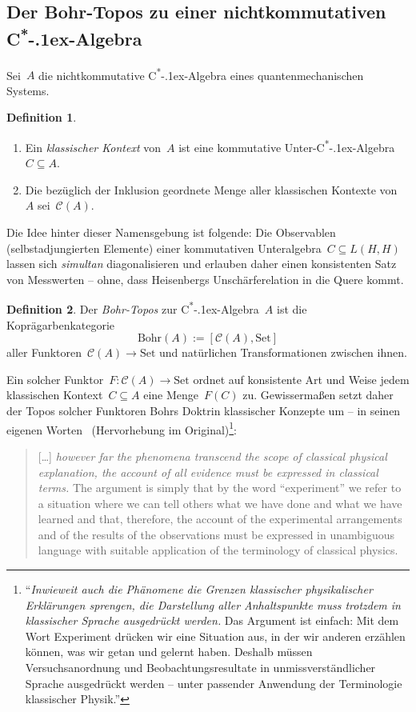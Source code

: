 \documentclass[a4paper,ngerman,12pt]{scrartcl}
\theoremstyle{definition}
\newtheorem{defn}{Definition}[section]
\theoremstyle{plain}
\theoremstyle{remark}
\newcommand{\C}{\mathcal{C}}
\newcommand{\Bohr}{\mathrm{Bohr}}
\newcommand{\csalgebra}{C\textsuperscript{*}\kern-.1ex-Algebra}
\newcommand{\Set}{\mathrm{Set}}
\renewcommand{\_}{\mathpunct{.}\,}
\newcommand{\?}{\,{:}\,}
\begin{document}
\subsection{Der Bohr-Topos zu einer nichtkommutativen \csalgebra}

Sei~$A$ die nichtkommutative \csalgebra{} eines quantenmechanischen Systems.

\begin{defn}\begin{enumerate}
\item
Ein \emph{klassischer Kontext} von~$A$ ist eine kommutative Unter-\csalgebra~$C
\subseteq A$.
\item Die bezüglich der Inklusion geordnete Menge aller klassischen Kontexte
von~$A$ sei~$\C(A)$.
\end{enumerate}
\end{defn}

Die Idee hinter dieser Namensgebung ist folgende: Die Observablen
(selbstadjungierten Elemente) einer kommutativen Unteralgebra~$C \subseteq
L(H,H)$ lassen sich \emph{simultan} diagonalisieren und erlauben daher einen
konsistenten Satz von Messwerten -- ohne, dass Heisenbergs Unschärferelation in
die Quere kommt.

\begin{defn}Der \emph{Bohr-Topos} zur \csalgebra~$A$ ist die Koprägarbenkategorie
\[ \Bohr(A) := [\C(A), \Set] \]
aller Funktoren~$\C(A) \to \Set$ und natürlichen Transformationen zwischen
ihnen.\end{defn}

Ein solcher Funktor~$F : \C(A) \to \Set$ ordnet auf konsistente Art und Weise
jedem klassischen Kontext~$C \subseteq A$ eine Menge~$F(C)$ zu. Gewissermaßen
setzt daher der Topos solcher Funktoren Bohrs Doktrin klassischer Konzepte um
-- in seinen eigenen Worten~\cite[Seite~209]{bohr} (Hervorhebung im
Original)\footnote{"`\emph{Inwieweit auch
die Phänomene die Grenzen klassischer physikalischer
Erklärungen sprengen, die Darstellung aller Anhaltspunkte muss trotzdem
in klassischer Sprache ausgedrückt werden.} Das Argument ist einfach:
Mit dem Wort \glq Experiment\grq{} drücken wir eine Situation aus, in der wir
anderen erzählen können, was wir getan und gelernt haben. Deshalb müssen
Versuchsanordnung und Beobachtungsresultate in
unmissverständlicher Sprache ausgedrückt werden -- unter passender
Anwendung der Terminologie klassischer Physik."'}:
\begin{quote}
[\ldots] \emph{however far the phenomena transcend the scope of classical physical
explanation, the account of all evidence must be expressed in
classical terms.} The argument is simply that by the word ``experiment''
we refer to a situation where we can tell others what we
have done and what we have learned and that, therefore, the account of
the experimental arrangements and of the results of the observations
must be expressed in unambiguous language with suitable application of
the terminology of classical physics.
\end{quote}
\end{document}
